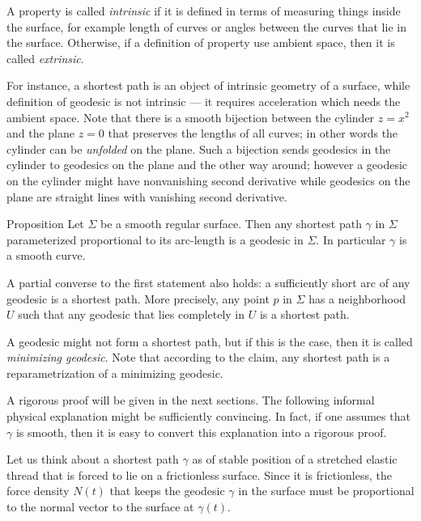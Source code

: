 A property is called \emph{intrinsic} if it is defined in terms of measuring things inside the surface, for example length of curves or angles between the curves that lie in the surface.
Otherwise, if a definition of property use ambient space, then it is called \emph{extrinsic}.

For instance, a shortest path is an object of intrinsic geometry of a surface,
while definition of geodesic is not intrinsic --- it requires acceleration which needs the ambient space.
Note that there is a smooth bijection between the cylinder $z=x^2$ and the plane $z=0$ that preserves the lengths of all curves; in other words the cylinder can be \emph{unfolded} on the plane.
Such a bijection sends geodesics in the cylinder to geodesics on the plane and the other way around; however a geodesic on the cylinder might have nonvanishing second derivative while geodesics on the plane are straight lines with vanishing second derivative.

\begin{thm}{Proposition}\label{prop:gamma''}
Let $\Sigma$ be a smooth regular surface.
Then any shortest path $\gamma$ in $\Sigma$ parameterized proportional to its arc-length is a geodesic in $\Sigma$.
In particular $\gamma$ is a smooth curve.

A partial converse to the first statement also holds: a sufficiently short arc of any geodesic is a shortest path.
More precisely, any point $p$ in $\Sigma$ has a neighborhood $U$ such that any geodesic that lies completely in $U$ is a shortest path.
\end{thm}

A geodesic might not form a shortest path, but if this is the case, then it is called \emph{minimizing geodesic}.
Note that according to the claim, any shortest path is a reparametrization of a minimizing geodesic.

A rigorous proof will be given in the next sections. 
The following informal physical explanation might be sufficiently convincing.
In fact, if one assumes that $\gamma$ is smooth, then it is easy to convert this explanation into a rigorous proof.

Let us think about a shortest path $\gamma$ as of stable position of a stretched elastic thread that is forced to lie on a frictionless surface.
Since it is frictionless, the force density $N(t)$ that keeps the geodesic $\gamma$ in the surface must be proportional to the normal vector to the surface at $\gamma(t)$.

